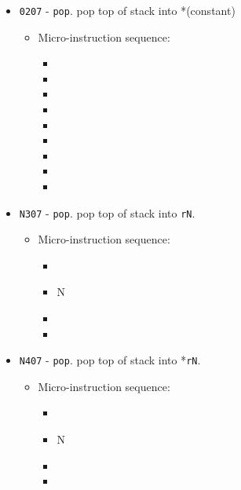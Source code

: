 \documentclass{article}
\begin{document}
\begin{itemize}
    \item \Verb|0207| - \Verb|pop|. pop top of stack into *(constant)
    \begin{itemize}
        \item Micro-instruction sequence:
        \begin{itemize}
            \item\pkptroutinc
	        \item\datatotmpa
	        \item\spptrout
	        \item\holddata
	        \item\tmpatoaddr
	        \item\writeRAM
	        \item\incrementpk
            \item\incrementsp
	        \item\done
        \end{itemize}
    \end{itemize}
    
    \item \Verb|N307| - \Verb|pop|. pop top of stack into \Verb|rN|.
    \begin{itemize}
        \item Micro-instruction sequence:
        \begin{itemize}
            \item \spptrout
            \item \datatoreg N
            \item \incrementsp
            \item \done
        \end{itemize}
    \end{itemize}
    
    \item \Verb|N407| - \Verb|pop|. pop top of stack into *\Verb|rN|.
    \begin{itemize}
        \item Micro-instruction sequence:
        \begin{itemize}
            \item \spptrout
            \item \datatoreg N
            \item \incrementsp
            \item \done
        \end{itemize}
    \end{itemize}
\end{itemize}
\end{document}
